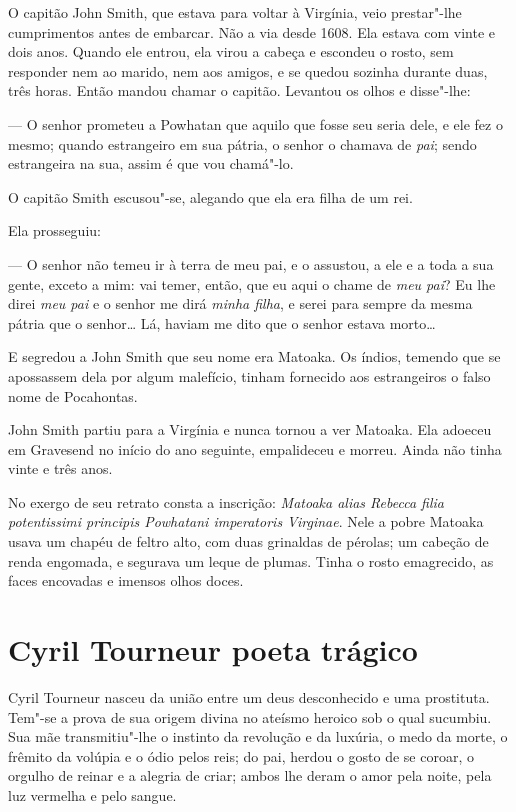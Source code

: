 O capitão John Smith, que estava para voltar à Virgínia, veio prestar"-lhe
cumprimentos antes de embarcar. Não a via desde 1608. Ela estava com vinte
e dois anos. Quando ele entrou, ela virou a cabeça e escondeu o rosto, sem
responder nem ao marido, nem aos amigos, e se quedou sozinha durante duas,
três horas. Então mandou chamar o capitão. Levantou os olhos e disse"-lhe:

--- O senhor prometeu a Powhatan que aquilo que fosse seu seria dele, e ele
fez o mesmo; quando estrangeiro em sua pátria, o senhor o chamava de
\textit{pai}; sendo estrangeira na sua, assim é que vou chamá"-lo.

O capitão Smith escusou"-se, alegando que ela era filha de um rei.

Ela prosseguiu:

--- O senhor não temeu ir à terra de meu pai, e o assustou, a ele e a toda a
sua gente, exceto a mim: vai temer, então, que eu aqui o chame de
\textit{meu pai}? Eu lhe direi \textit{meu pai} e o senhor me dirá
\textit{minha filha}, e serei para sempre da mesma pátria que o senhor\ldots{}
Lá, haviam me dito que o senhor estava morto\ldots{}

E segredou a John Smith que seu nome era Matoaka. Os índios, temendo que se
apossassem dela por algum malefício, tinham fornecido aos estrangeiros o
falso nome de Pocahontas.

John Smith partiu para a Virgínia e nunca tornou a ver Matoaka. Ela adoeceu
em Gravesend no início do ano seguinte, empalideceu e morreu. Ainda não
tinha vinte e três anos.

No exergo de seu retrato consta a inscrição: \textit{Matoaka alias Rebecca
filia potentissimi principis Powhatani imperatoris Virginae}. Nele a pobre
Matoaka usava um chapéu de feltro alto, com duas grinaldas de pérolas; um
cabeção de renda engomada, e segurava um leque de plumas. Tinha o rosto
emagrecido, as faces encovadas e imensos olhos doces.

\chapter{Cyril Tourneur poeta trágico}

Cyril Tourneur nasceu da união entre um deus desconhecido e uma prostituta.
Tem"-se a prova de sua origem divina no ateísmo heroico sob o qual
sucumbiu. Sua mãe transmitiu"-lhe o instinto da revolução e da luxúria, o
medo da morte, o frêmito da volúpia e o ódio pelos reis; do pai, herdou o
gosto de se coroar, o orgulho de reinar e a alegria de criar; ambos lhe
deram o amor pela noite, pela luz vermelha e pelo sangue.

